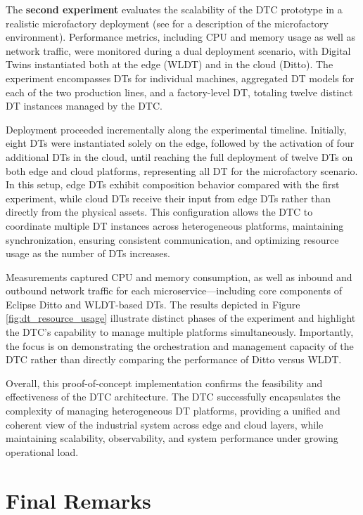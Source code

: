 The \textbf{second experiment} evaluates the scalability of the DTC prototype in a realistic microfactory deployment (see  for a description of the microfactory environment).
Performance metrics, including CPU and memory usage as well as network traffic, were monitored during a dual deployment scenario, with Digital Twins instantiated both at the edge (WLDT) and in the cloud (Ditto). The experiment encompasses DTs for individual machines, aggregated DT models for each of the two production lines, and a factory-level DT, totaling twelve distinct DT instances managed by the \ac{DTC}.

Deployment proceeded incrementally along the experimental timeline. Initially, eight DTs were instantiated solely on the edge, followed by the activation of four additional DTs in the cloud, until reaching the full deployment of twelve DTs on both edge and cloud platforms, representing all DT for the microfactory scenario.
%
In this setup, edge DTs exhibit composition behavior compared with the first experiment, while cloud DTs receive their input from edge DTs rather than directly from the physical assets. This configuration allows the DTC to coordinate multiple DT instances across heterogeneous platforms, maintaining synchronization, ensuring consistent communication, and optimizing resource usage as the number of DTs increases.

Measurements captured CPU and memory consumption, as well as inbound and outbound network traffic for each microservice—including core components of Eclipse Ditto and WLDT-based DTs. The results depicted in Figure \ref{fig:dt_resource_usage} illustrate distinct phases of the experiment and highlight the DTC's capability to manage multiple platforms simultaneously. Importantly, the focus is on demonstrating the orchestration and management capacity of the DTC rather than directly comparing the performance of Ditto versus WLDT.

Overall, this proof-of-concept implementation confirms the feasibility and effectiveness of the DTC architecture. The DTC successfully encapsulates the complexity of managing heterogeneous \ac{DT} platforms, providing a unified and coherent view of the industrial system across edge and cloud layers, while maintaining scalability, observability, and system performance under growing operational load.

\section{Final Remarks}

